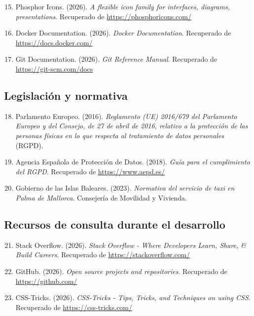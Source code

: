 \documentclass[12pt,a4paper]{article}
\begin{document}
\begin{enumerate}
    \setcounter{enumi}{14}
    
    \item Phosphor Icons. (2026). \textit{A flexible icon family for interfaces, diagrams, presentations}. Recuperado de \url{https://phosphoricons.com/}
    
    \item Docker Documentation. (2026). \textit{Docker Documentation}. Recuperado de \url{https://docs.docker.com/}
    
    \item Git Documentation. (2026). \textit{Git Reference Manual}. Recuperado de \url{https://git-scm.com/docs}
\end{enumerate}

\subsection{Legislación y normativa}

\begin{enumerate}
    \setcounter{enumi}{17}
    
    \item Parlamento Europeo. (2016). \textit{Reglamento (UE) 2016/679 del Parlamento Europeo y del Consejo, de 27 de abril de 2016, relativo a la protección de las personas físicas en lo que respecta al tratamiento de datos personales} (RGPD).
    
    \item Agencia Española de Protección de Datos. (2018). \textit{Guía para el cumplimiento del RGPD}. Recuperado de \url{https://www.aepd.es/}
    
    \item Gobierno de las Islas Baleares. (2023). \textit{Normativa del servicio de taxi en Palma de Mallorca}. Consejería de Movilidad y Vivienda.
\end{enumerate}

\subsection{Recursos de consulta durante el desarrollo}

\begin{enumerate}
    \setcounter{enumi}{20}
    
    \item Stack Overflow. (2026). \textit{Stack Overflow - Where Developers Learn, Share, \& Build Careers}. Recuperado de \url{https://stackoverflow.com/}
    
    \item GitHub. (2026). \textit{Open source projects and repositories}. Recuperado de \url{https://github.com/}
    
    \item CSS-Tricks. (2026). \textit{CSS-Tricks - Tips, Tricks, and Techniques on using CSS}. Recuperado de \url{https://css-tricks.com/}
\end{enumerate}
\end{document}
